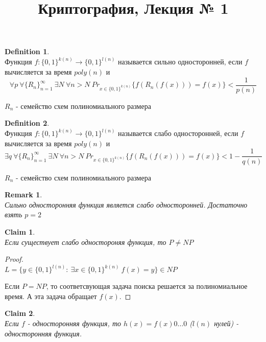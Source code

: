\documentclass[a4paper]{article}
\title{Криптография, Лекция № 1}
\theoremstyle{definition}
\newtheorem{definition}{Definition}
\theoremstyle{plain}
\newtheorem{remark}{Remark}
\newtheorem{claim}{Claim}
\begin{document}
\maketitle

\begin{definition}~\\
    Функция $f\colon \{0, 1\}^{k(n)} \rightarrow \{0, 1\}^{l(n)}$ называется сильно односторонней, если $f$ вычисляется за время $poly(n)$ и
    $$
        \forall p\ \forall\{R_n\}_{n = 1}^{\infty}\ \exists N\ \forall n > N\ Pr_{x \in \{0, 1\}^{k(n)}}\{f(R_n(f(x))) = f(x)\} < \frac{1}{p(n)}
    $$
    
  \noindent $R_n$ - семейство схем полиномиального размера
\end{definition}


\begin{definition}~\\
    Функция $f\colon \{0, 1\}^{k(n)} \rightarrow \{0, 1\}^{l(n)}$ называется слабо односторонней, если $f$ вычисляется за время $poly(n)$ и 
    $$
        \exists q\ \forall\{R_n\}_{n = 1}^{\infty}\ \exists N\ \forall n > N\ Pr_{x \in \{0, 1\}^{k(n)}}\{f(R_n(f(x))) = f(x)\} < 1 - \frac{1}{q(n)}
        $$
    
  \noindent $R_n$ - семейство схем полиномиального размера
\end{definition}


\begin{remark}~\\
    Сильно односторонняя функция является слабо односторонней. Достаточно взять $p = 2$
\end{remark}


\begin{claim}~\\
    Если существует слабо одностороняя функция, то $P \ne NP$
\end{claim}

\begin{proof}~\\
    $L = \{y \in \{0, 1\}^{l(n)} \colon\ \exists x \in \{0, 1\}^{k(n)}\ f(x) = y\} \in NP$
    
    \noindent Если $P = NP$, то соответсвующая задача поиска решается за полиномиальное время. А эта задача обращает $f(x)$.
\end{proof}

\begin{claim}~\\
    Если $f$ - односторонняя функция, то $h(x) = f(x)0\ldots0$ ($l(n)$ нулей) - односторонняя функция.
\end{claim}
\end{document}
